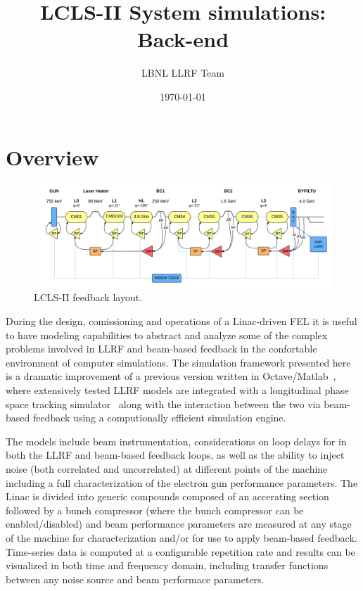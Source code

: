 \documentclass[a4paper,12pt]{article}
\title{\textbf{LCLS-II System simulations:\\Back-end}}
\author{LBNL LLRF Team}
\date{\today}
\begin{document}
\maketitle
\setcounter{tocdepth}{3}
\tableofcontents

\newpage

\section{Overview}

\begin{figure}
\centering
\includegraphics[scale=0.11]{../figures/LCLS-II_feedback_layout.png}
\caption{LCLS-II feedback layout.}
\label{fig:lclsII-feedback_layout}
\end{figure}

During the design, comissioning and operations of a Linac-driven FEL it is useful to have modeling capabilities to abstract and analyze some of the complex problems involved in LLRF and beam-based feedback in the confortable environment of computer simulations. The simulation framework presented here is a dramatic improvement of a previous version written in Octave/Matlab~\cite{ref:model-paper}, where extensively tested LLRF models are integrated with a longitudinal phase space tracking simulator~\cite{ref:litrack} along with the interaction between the two via beam-based feedback using a computionally efficient simulation engine. 

The models include beam instrumentation, considerations on loop delays for in both the LLRF and beam-based feedback loops, as well as the ability to inject noise (both correlated and uncorrelated) at different points of the machine including a full characterization of the electron gun performance parameters. The Linac is divided into generic compounds composed of an accerating section followed by a bunch compressor (where the bunch compressor can be enabled/disabled) and beam performance parameters are measured at any stage of the machine for characterization and/or for use to apply beam-based feedback. Time-series data is computed at a configurable repetition rate and results can be visualized in both time and frequency domain, including transfer functions between any noise source and beam performace parameters.
\end{document}
